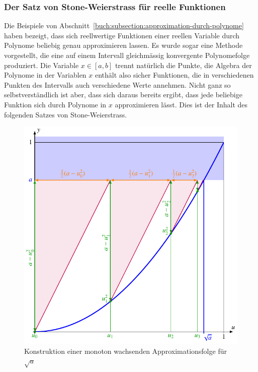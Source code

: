 \subsubsection{Der Satz von Stone-Weierstrass für reelle Funktionen}
%
%
Die Beispiele von Abschnitt~\ref{buch:subsection:approximation-durch-polynome}
haben bezeigt, dass sich reellwertige Funktionen einer reellen
Variable durch Polynome beliebig genau approximieren lassen.
Es wurde sogar eine Methode vorgestellt, die eine auf einem Intervall
gleichmässig konvergente Polynomefolge produziert.
Die Variable $x\in[a,b]$ trennt natürlich die Punkte, die Algebra der
Polynome in der Variablen $x$ enthält also sicher Funktionen, die in
verschiedenen Punkten des Intervalls auch verschiedene Werte annehmen.
Nicht ganz so selbstverständlich ist aber, dass sich daraus bereits
ergibt, dass jede beliebige Funktion sich durch Polynome in $x$
approximieren lässt.
Dies ist der Inhalt des folgenden Satzes von Stone-Weierstrass.

\begin{figure}
\centering
\includegraphics{chapters/40-eigenwerte/images/wurzel.pdf}
\caption{Konstruktion einer monoton wachsenden Approximationsfolge für
$\sqrt{a}$
\label{buch:eigenwerte:fig:wurzelverfahren}}
\end{figure}

